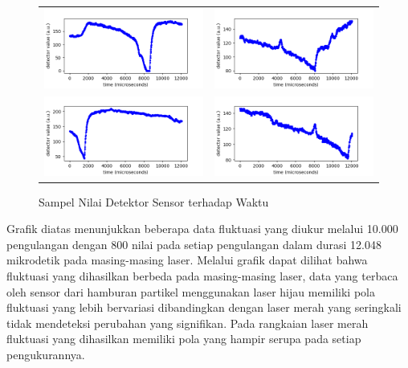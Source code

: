 \begin{figure}[H]
  \ContinuedFloat
  \begin{longtable}{p{7cm}p{7cm}}
    \includegraphics[width=8cm]{Images/RawData_Hijau_Data100-01.png}
    &
    \includegraphics[width=8cm]{Images/RawData_Merah_Data99-01.png} \\

    \includegraphics[width=8cm]{Images/RawData_Hijau_Data1000-01.png}
    \centering{Laser Hijau}
    &
    \includegraphics[width=8cm]{Images/RawData_Merah_Data1000-01.png} 
    \centering{Laser Merah}\\
  \end{longtable}

  \caption{Sampel Nilai Detektor Sensor terhadap Waktu}
\end{figure}

Grafik diatas menunjukkan beberapa data fluktuasi yang diukur
melalui 10.000 pengulangan dengan 800 nilai pada setiap
pengulangan dalam durasi 12.048 mikrodetik pada masing-masing
laser. Melalui grafik dapat dilihat bahwa fluktuasi yang
dihasilkan berbeda pada masing-masing laser, data yang terbaca
oleh sensor dari hamburan partikel menggunakan laser hijau
memiliki pola fluktuasi yang lebih bervariasi dibandingkan
dengan laser merah yang seringkali tidak mendeteksi perubahan
yang signifikan. Pada rangkaian laser merah  fluktuasi yang
dihasilkan memiliki pola yang hampir serupa pada setiap
pengukurannya.


